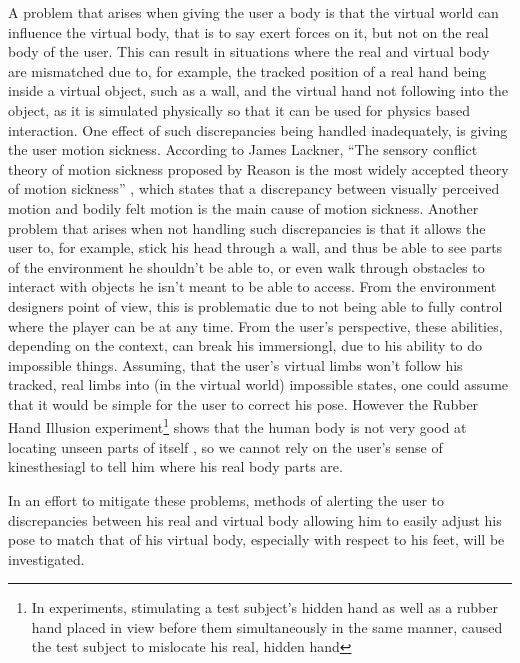 A problem that arises when giving the user a body is that the virtual world can influence the virtual body, that is to say exert forces on it, but not on the real body of the user. This can result in situations where the real and virtual body are mismatched due to, for example, the tracked position of a real hand being inside a virtual object, such as a wall, and the virtual hand not following into the object, as it is simulated physically so that it can be used for physics based interaction.
\newline
One effect of such discrepancies being handled inadequately, is giving the user motion sickness. According to James Lackner, \enquote{The sensory conflict theory of motion sickness proposed by Reason \textelp{} is the most widely accepted theory of motion sickness} \autocite[p. ~11 in pdf]{motionSickness}, which states that a discrepancy between visually perceived motion and bodily felt motion is the main cause of motion sickness. 
\newline
Another problem that arises when not handling such discrepancies is that it allows the user to, for example, stick his head through a wall, and thus be able to see parts of the environment he shouldn't be able to, or even walk through obstacles to interact with objects he isn't meant to be able to access. From the environment designers point of view, this is problematic due to not being able to fully control where the player can be at any time. From the user's perspective, these abilities, depending on the context, can break his \gls{immersiongl}, due to his ability to do impossible things. 
\newline
Assuming, that the user's virtual limbs won't follow his tracked, real limbs into (in the virtual world) impossible states, one could assume that it would be simple for the user to correct his pose. However the Rubber Hand Illusion experiment\footnote{In experiments, stimulating a test subject's hidden hand as well as a rubber hand placed in view before them simultaneously in the same manner, caused the test subject to mislocate his real, hidden hand} shows that the human body is not very good at locating unseen parts of itself \autocite{rubberHandsFeel}, so we cannot rely on the user's sense of \gls{kinesthesiagl} to tell him where his real body parts are.
\newline

In an effort to mitigate these problems, methods of alerting the user to discrepancies between his real and virtual body allowing him to easily adjust his pose to match that of his virtual body, especially with respect to his feet, will be investigated. 



